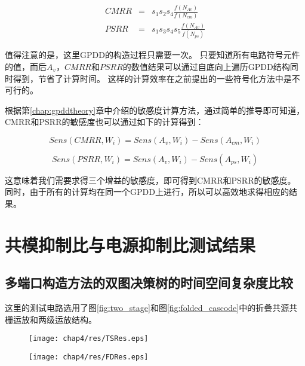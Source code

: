 \begin{eqnarray}
CMRR &=& s_1 s_2 s_4 \frac{f\left(N_{Av}\right)}{f\left(N_{cm}\right)}\\
PSRR &=& s_1 s_3 s_4 s_5 \frac{f\left(N_{Av}\right)}{f\left(N_{ps}\right)}
\end{eqnarray}

值得注意的是，这里GPDD的构造过程只需要一次。
只要知道所有电路符号元件的值，而后$A_v$，$CMRR$和$PSRR$的数值结果可以通过自底向上遍历GPDD结构同时得到，节省了计算时间。
这样的计算效率在之前提出的一些符号化方法中是不可行的\parencite{Gielen-ISAAC-1989}。

根据第\ref{chap:gpddtheory}章中介绍的敏感度计算方法，通过简单的推导即可知道，CMRR和PSRR的敏感度也可以通过如下的计算得到：

\begin{equation}
Sens\left( {{CMRR},{W_i}} \right) = Sens\left( {{A_{v}},{W_i}} \right) - Sens\left( {{A_{cm}},{W_i}} \right)
\end{equation}

\begin{equation}
Sens\left( {{PSRR},{W_i}} \right) = Sens\left( {{A_{v}},{W_i}} \right) - Sens\left( {{A_{ps}},{W_i}} \right)
\end{equation}

这意味着我们需要求得三个增益的敏感度，即可得到CMRR和PSRR的敏感度。
同时，由于所有的计算均在同一个GPDD上进行，所以可以高效地求得相应的结果。

\section{共模抑制比与电源抑制比测试结果}

\subsection{多端口构造方法的双图决策树的时间空间复杂度比较}

这里的测试电路选用了图\ref{fig:two_stage}和图\ref{fig:folded_cascode}中的折叠共源共栅运放和两级运放结构。

\begin{figure}[!htp]
	\centering
	\texttt{[image: chap4/res/TSRes.eps]}
\end{figure}

\begin{figure}[!htp]
	\centering
	\texttt{[image: chap4/res/FDRes.eps]}
\end{figure}

